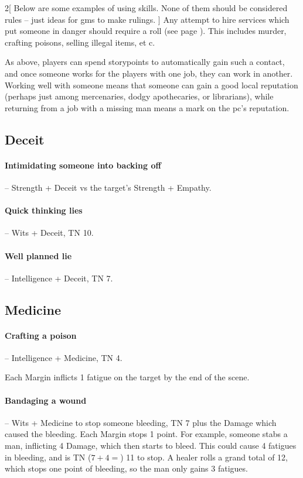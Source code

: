 \begin{multicols}{2}[
  Below are some examples of using skills.
  None of them should be considered rules -- just ideas for \glspl{gm} to make rulings.
]
Any attempt to hire services which put someone in danger should require a roll (see page \pageref{services}).
This includes murder, crafting poisons, selling illegal items, et c.

As above, players can spend \glspl{storypoint} to automatically gain such a contact, and once someone works for the players with one job, they can work in another.
Working well with someone means that someone can gain a good local reputation (perhaps just among mercenaries, dodgy apothecaries, or librarians), while returning from a job with a missing man means a mark on the \gls{pc}'s reputation.

\subsection{Deceit}

\paragraph{Intimidating someone into backing off} -- Strength + Deceit vs the target's Strength + Empathy.

\paragraph{Quick thinking lies} -- Wits + Deceit, TN 10.

\paragraph{Well planned lie} -- Intelligence + Deceit, TN 7.

\subsection{Medicine}

\paragraph{Crafting a poison} -- Intelligence + Medicine, TN 4.
\label{poison}

Each Margin inflicts 1 \gls{fatigue} on the target by the end of the scene.

\paragraph{Bandaging a wound} -- Wits + Medicine to stop someone bleeding, TN 7 plus the Damage which caused the bleeding.
Each Margin stops 1 point.
For example, someone stabs a man, inflicting 4 Damage, which then starts to bleed.
This could cause 4 \glspl{fatigue} in bleeding, and is TN ($7 + 4 = $) 11 to stop.
A healer rolls a grand total of 12, which stops one point of bleeding, so the man only gains 3 \glspl{fatigue}.


\end{multicols}
